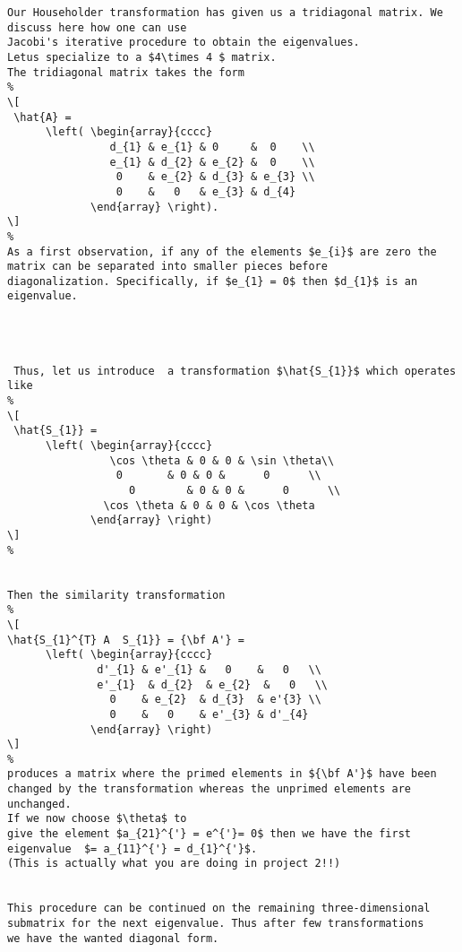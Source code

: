 {\begin{lstlisting}
Our Householder transformation has given us a tridiagonal matrix. We discuss here how one can use
Jacobi's iterative procedure to obtain the eigenvalues. 
Letus specialize to a $4\times 4 $ matrix.
The tridiagonal matrix takes the form
%
\[
 \hat{A} =
      \left( \begin{array}{cccc} 
                d_{1} & e_{1} & 0     &  0    \\
                e_{1} & d_{2} & e_{2} &  0    \\
                 0    & e_{2} & d_{3} & e_{3} \\
                 0    &   0   & e_{3} & d_{4} 
             \end{array} \right).
\]
%
As a first observation, if any of the elements $e_{i}$ are zero the
matrix can be separated into smaller pieces before
diagonalization. Specifically, if $e_{1} = 0$ then $d_{1}$ is an
eigenvalue.




 Thus, let us introduce  a transformation $\hat{S_{1}}$ which operates like
%
\[
 \hat{S_{1}} =
      \left( \begin{array}{cccc} 
                \cos \theta & 0 & 0 & \sin \theta\\
                 0       & 0 & 0 &      0      \\
                   0        & 0 & 0 &      0      \\
               \cos \theta & 0 & 0 & \cos \theta 
             \end{array} \right)
\]
%


Then the similarity transformation 
%
\[
\hat{S_{1}^{T} A  S_{1}} = {\bf A'} = 
      \left( \begin{array}{cccc}
              d'_{1} & e'_{1} &   0    &   0   \\
              e'_{1}  & d_{2}  & e_{2}  &   0   \\
                0    & e_{2}  & d_{3}  & e'{3} \\
                0    &   0    & e'_{3} & d'_{4}
             \end{array} \right)
\]
%
produces a matrix where the primed elements in ${\bf A'}$ have been
changed by the transformation whereas the unprimed elements are unchanged.
If we now choose $\theta$ to
give the element $a_{21}^{'} = e^{'}= 0$ then we have the first
eigenvalue  $= a_{11}^{'} = d_{1}^{'}$.
(This is actually what you are doing in project 2!!)


This procedure can be continued on the remaining three-dimensional
submatrix for the next eigenvalue. Thus after few transformations    
we have the wanted diagonal form.


\end{lstlisting}}
